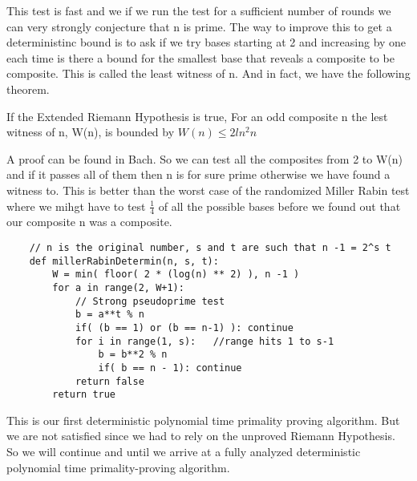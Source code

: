 \documentclass{article}
\begin{document}
This test is fast and we if we run the test for a sufficient number of rounds we can very strongly conjecture that n is prime. The way to improve this to get a deterministinc bound is to ask if we try bases starting at 2 and increasing by one each time is there a bound for the smallest base that reveals a composite to be composite. This is called the least witness of n. And in fact, we have the following theorem. 
\begin{theorem}
    If the Extended Riemann Hypothesis is true, For an odd composite n the lest witness  of n, W(n), is bounded by $W(n) \leq 2 ln^2 n$
\end{theorem}
A proof can be found in Bach\cite{bach1985analytic}. So we can test all the composites from 2 to W(n) and if it passes all of them then n is for sure prime otherwise we have found a witness to. This is better than the worst case of the randomized Miller Rabin test where we mihgt have to test $\frac{1}{4}$ of all the possible bases before we found out that our composite n was a composite. 
\begin{verbatim}
    // n is the original number, s and t are such that n -1 = 2^s t
    def millerRabinDetermin(n, s, t):
        W = min( floor( 2 * (log(n) ** 2) ), n -1 )
        for a in range(2, W+1):
            // Strong pseudoprime test
            b = a**t % n
            if( (b == 1) or (b == n-1) ): continue
            for i in range(1, s):   //range hits 1 to s-1
                b = b**2 % n
                if( b == n - 1): continue
            return false
        return true
\end{verbatim}
This is our first deterministic polynomial time primality proving algorithm. But we are not satisfied since we had to rely on the unproved Riemann Hypothesis. So we will continue and until we arrive at a fully analyzed deterministic polynomial time primality-proving algorithm. 
\end{document}
